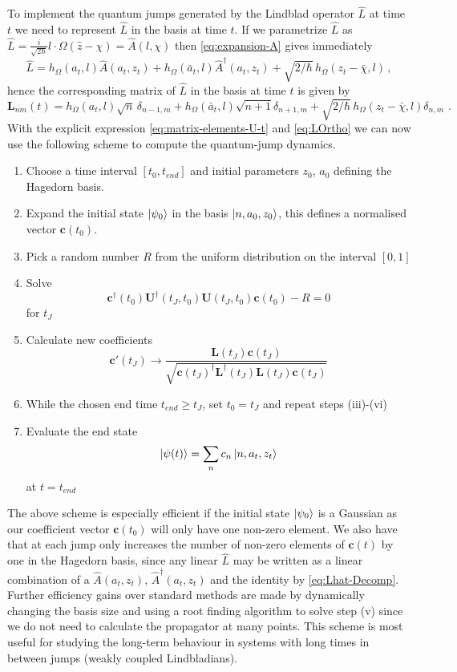 \documentclass[12pt]{iopart} %
\begin{document}
To implement the quantum jumps generated by the Lindblad operator $\hat L$ at time $t$ we need to represent  $\hat L$ in the basis at time $t$. If we parametrize $\hat L$ as
 $\hat L=\frac{i}{\sqrt{2 \hbar}}l\cdot\Omega(\hat z-\chi)=\hat A(l,\chi)$ then \eqref{eq:expansion-A} gives immediately 
\begin{equation} \label{eq:Lhat-Decomp}
    \hat L=h_{\Omega}(a_t,l)\hat A(a_t,z_t)+h_{\Omega}(\bar a_t,l)\hat A^{\dagger}(a_t,z_t)
+\sqrt{2/\hbar}\, h_{\Omega}(z_t-\bar \chi, l)\, ,
\end{equation}
hence the corresponding matrix of $\hat L$ in the basis at time $t$ is given by
\begin{equation} \label{eq:LOrtho}
    \mathbf{L}_{nm}(t)=h_{\Omega}(a_t,l)\sqrt{n}\, \delta_{n-1,m}+h_{\Omega}(\bar a_t,l)\sqrt{n+1}\delta_{n+1,m}
+\sqrt{2/\hbar}\, h_{\Omega}(z_t-\bar \chi, l)\delta_{n,m}\,\, .
\end{equation}
With the explicit expression \eqref{eq:matrix-elements-U-t} and \eqref{eq:LOrtho} we can now use the following scheme to compute the quantum-jump dynamics. 
\begin{enumerate}
	\item Choose a time interval $[t_0,t_{end}]$ and initial parameters $z_{0}$, $a_{0}$ defining the Hagedorn basis.
	\item Expand the initial state $\ket{\psi_0}$ in the basis $\ket{n, a_0,z_0}$, this defines a normalised vector $\mathbf{c}(t_0)$.
    \item Pick a random number $R$ from the uniform distribution on the interval $[0,1]$
    \item Solve $$\mathbf{c}^{\dagger}(t_0)\mathbf{U}^{\dagger}(t_J,t_0)\mathbf{U}(t_J,t_0)\mathbf{c}(t_0)-R=0$$
    for $t_{J}$
    \item Calculate new coefficients $$\mathbf{c}'(t_J)\to\frac{\mathbf{L}(t_{J}) \mathbf{c}(t_J)}{\sqrt{\mathbf{c}(t_J)^{\dagger}\mathbf{L}^{\dagger}(t_{J}) \mathbf{L}(t_{J})\mathbf{c}(t_J)}}$$
    \item While the chosen end time $t_{end}\geq t_{J}$, set $t_0=t_J$ and repeat steps (iii)-(vi)
    \item Evaluate the end state $$\ket{\psi(t)}=\sum_n c_n\ket{n,a_{t},z_t}$$
    at $t=t_{end}$
\end{enumerate}
The above scheme is especially efficient if the initial state $\ket{\psi_0}$ is a Gaussian as our coefficient vector $\mathbf{c}(t_0)$ will only have one non-zero element. We also have that at each jump only increases the number of non-zero elements of $\mathbf{c}(t)$ by one in the Hagedorn basis, since any linear $\hat L$ may be written as a linear combination of a $\hat A(a_t,z_t)$, $\hat A^{\dagger}(a_t,z_t)$ and the identity by \cref{eq:Lhat-Decomp}. Further efficiency gains over standard methods are made by dynamically changing the basis size and using a root finding algorithm to solve step (v) since we do not need to calculate the propagator at many points. This scheme is most useful for studying the long-term behaviour in systems with long times in between jumps (weakly coupled Lindbladians).
\end{document}
